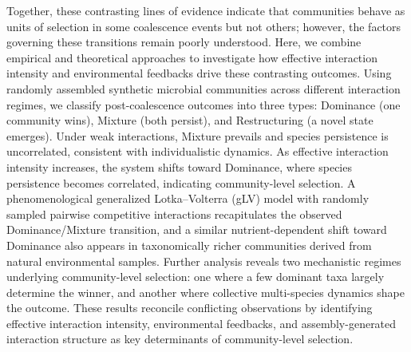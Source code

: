 Together, these contrasting lines of evidence indicate that communities behave as units of selection in some coalescence events but not others; however, the factors governing these transitions remain poorly understood. Here, we combine empirical and theoretical approaches to investigate how effective interaction intensity and environmental feedbacks drive these contrasting outcomes. Using randomly assembled synthetic microbial communities across different interaction regimes, we classify post-coalescence outcomes into three types: Dominance (one community wins), Mixture (both persist), and Restructuring (a novel state emerges). Under weak interactions, Mixture prevails and species persistence is uncorrelated, consistent with individualistic dynamics. As effective interaction intensity increases, the system shifts toward Dominance, where species persistence becomes correlated, indicating community-level selection. A phenomenological generalized Lotka--Volterra (gLV) model with randomly sampled pairwise competitive interactions recapitulates the observed Dominance/Mixture transition, and a similar nutrient-dependent shift toward Dominance also appears in taxonomically richer communities derived from natural environmental samples. Further analysis reveals two mechanistic regimes underlying community-level selection: one where a few dominant taxa largely determine the winner, and another where collective multi-species dynamics shape the outcome. These results reconcile conflicting observations by identifying effective interaction intensity, environmental feedbacks, and assembly-generated interaction structure as key determinants of community-level selection.
